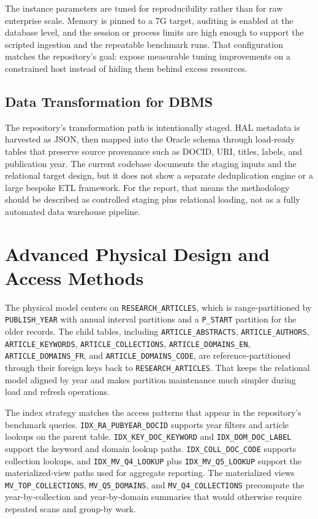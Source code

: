 \documentclass[conference]{IEEEtran}
\begin{document}
The instance parameters are tuned for reproducibility rather than for raw enterprise scale. Memory is pinned to a 7G target, auditing is enabled at the database level, and the session or process limits are high enough to support the scripted ingestion and the repeatable benchmark runs. That configuration matches the repository's goal: expose measurable tuning improvements on a constrained host instead of hiding them behind excess resources.

\subsection{Data Transformation for DBMS}
The repository's transformation path is intentionally staged. HAL metadata is harvested as JSON, then mapped into the Oracle schema through load-ready tables that preserve source provenance such as DOCID, URI, titles, labels, and publication year. The current codebase documents the staging inputs and the relational target design, but it does not show a separate deduplication engine or a large bespoke ETL framework. For the report, that means the methodology should be described as controlled staging plus relational loading, not as a fully automated data warehouse pipeline.



\section{Advanced Physical Design and Access Methods}
The physical model centers on \verb|RESEARCH_ARTICLES|, which is range-partitioned by \verb|PUBLISH_YEAR| with annual interval partitions and a \verb|P_START| partition for the older records. The child tables, including \verb|ARTICLE_ABSTRACTS|, \verb|ARTICLE_AUTHORS|, \verb|ARTICLE_KEYWORDS|, \verb|ARTICLE_COLLECTIONS|, \verb|ARTICLE_DOMAINS_EN|, \verb|ARTICLE_DOMAINS_FR|, and \verb|ARTICLE_DOMAINS_CODE|, are reference-partitioned through their foreign keys back to \verb|RESEARCH_ARTICLES|. That keeps the relational model aligned by year and makes partition maintenance much simpler during load and refresh operations.

The index strategy matches the access patterns that appear in the repository's benchmark queries. \verb|IDX_RA_PUBYEAR_DOCID| supports year filters and article lookups on the parent table. \verb|IDX_KEY_DOC_KEYWORD| and \verb|IDX_DOM_DOC_LABEL| support the keyword and domain lookup paths. \verb|IDX_COLL_DOC_CODE| supports collection lookups, and \verb|IDX_MV_Q4_LOOKUP| plus \verb|IDX_MV_Q5_LOOKUP| support the materialized-view paths used for aggregate reporting. The materialized views \verb|MV_TOP_COLLECTIONS|, \verb|MV_Q5_DOMAINS|, and \verb|MV_Q4_COLLECTIONS| precompute the year-by-collection and year-by-domain summaries that would otherwise require repeated scans and group-by work.
\end{document}
